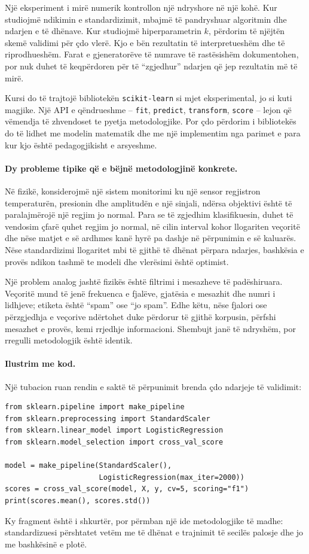 \documentclass[12pt,a4paper,oneside]{book}
\begin{document}
Një eksperiment i mirë numerik kontrollon një ndryshore në një kohë. Kur studiojmë ndikimin e standardizimit, mbajmë të pandryshuar algoritmin dhe ndarjen e të dhënave. Kur studiojmë hiperparametrin $k$, përdorim të njëjtën skemë validimi për çdo vlerë. Kjo e bën rezultatin të interpretueshëm dhe të riprodhueshëm. Farat e gjeneratorëve të numrave të rastësishëm dokumentohen, por nuk duhet të keqpërdoren për të ``zgjedhur'' ndarjen që jep rezultatin më të mirë.

Kursi do të trajtojë bibliotekën \texttt{scikit-learn} si mjet eksperimental, jo si kuti magjike. Një API e qëndrueshme -- \texttt{fit}, \texttt{predict}, \texttt{transform}, \texttt{score} -- lejon që vëmendja të zhvendoset te pyetja metodologjike. Por çdo përdorim i bibliotekës do të lidhet me modelin matematik dhe me një implementim nga parimet e para kur kjo është pedagogjikisht e arsyeshme.


\paragraph{Dy probleme tipike që e bëjnë metodologjinë konkrete.}
Në fizikë, konsiderojmë një sistem monitorimi ku një sensor regjistron temperaturën, presionin dhe amplitudën e një sinjali, ndërsa objektivi është të paralajmërojë një regjim jo normal. Para se të zgjedhim klasifikuesin, duhet të vendosim çfarë quhet regjim jo normal, në cilin interval kohor llogariten veçoritë dhe nëse matjet e së ardhmes kanë hyrë pa dashje në përpunimin e së kaluarës. Nëse standardizimi llogaritet mbi të gjithë të dhënat përpara ndarjes, bashkësia e provës ndikon tashmë te modeli dhe vlerësimi është optimist.

Një problem analog jashtë fizikës është filtrimi i mesazheve të padëshiruara. Veçoritë mund të jenë frekuenca e fjalëve, gjatësia e mesazhit dhe numri i lidhjeve; etiketa është ``spam'' ose ``jo spam''. Edhe këtu, nëse fjalori ose përzgjedhja e veçorive ndërtohet duke përdorur të gjithë korpusin, përfshi mesazhet e provës, kemi rrjedhje informacioni. Shembujt janë të ndryshëm, por rregulli metodologjik është identik.

\paragraph{Ilustrim me kod.}
Një tubacion ruan rendin e saktë të përpunimit brenda çdo ndarjeje të validimit:
\begin{lstlisting}
from sklearn.pipeline import make_pipeline
from sklearn.preprocessing import StandardScaler
from sklearn.linear_model import LogisticRegression
from sklearn.model_selection import cross_val_score

model = make_pipeline(StandardScaler(),
                      LogisticRegression(max_iter=2000))
scores = cross_val_score(model, X, y, cv=5, scoring="f1")
print(scores.mean(), scores.std())
\end{lstlisting}
Ky fragment është i shkurtër, por përmban një ide metodologjike të madhe: standardizuesi përshtatet vetëm me të dhënat e trajnimit të secilës palosje dhe jo me bashkësinë e plotë.
\end{document}
